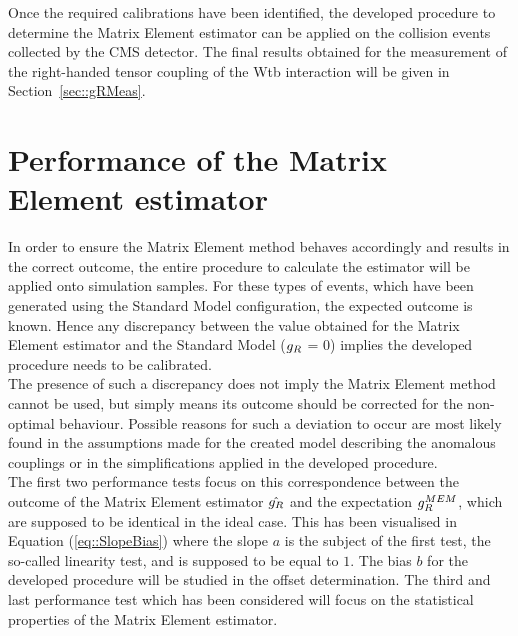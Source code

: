 %
%
Once the required calibrations have been identified, the developed procedure to determine the Matrix Element estimator can be applied on the collision events collected by the CMS detector.
The final results obtained for the measurement of the right-handed tensor coupling of the Wtb interaction will be given in Section~\ref{sec::gRMeas}.

\section{Performance of the Matrix Element estimator} \label{sec::EstimatorProp} %

In order to ensure the Matrix Element method behaves accordingly and results in the correct outcome, the entire procedure to calculate the estimator will be applied onto simulation samples.
For these types of events, which have been generated using the Standard Model configuration, the expected outcome is known. Hence any discrepancy between the value obtained for the Matrix Element estimator and the Standard Model ($g_{R}$ = 0) implies the developed procedure needs to be calibrated.
\\
The presence of such a discrepancy does not imply the Matrix Element method cannot be used, but simply means its outcome should be corrected for the non-optimal behaviour.
Possible reasons for such a deviation to occur are most likely found in the assumptions made for the created model describing the anomalous couplings or in the simplifications applied in the developed procedure.
\\

The first two performance tests focus on this correspondence between the outcome of the Matrix Element estimator $\hat{g_{R}}$ and the expectation $g_{R}^{MEM}$, which are supposed to be identical in the ideal case.
This has been visualised in Equation (\ref{eq::SlopeBias}) where the slope $a$ is the subject of the first test, the so-called linearity test, and is supposed to be equal to $1$. The bias $b$ for the developed procedure will be studied in the offset determination.
The third and last performance test which has been considered will focus on the statistical properties of the Matrix Element estimator.

